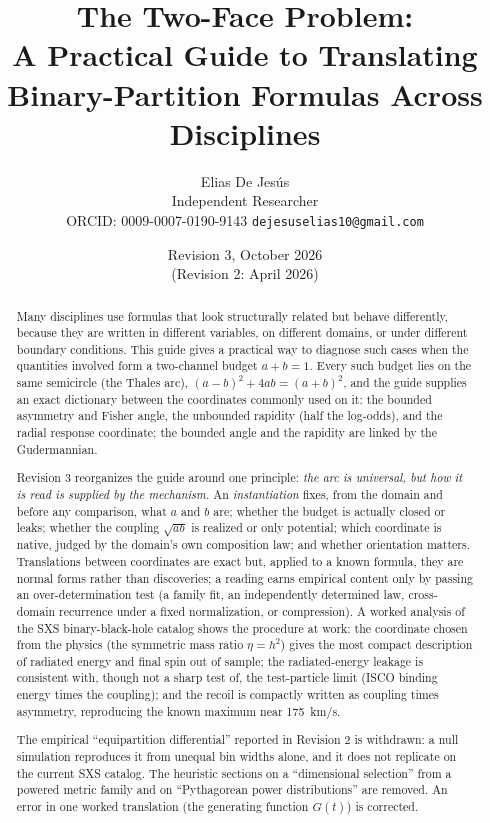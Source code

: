 \documentclass[11pt]{article}
\title{The Two-Face Problem:\\[2pt]
\large A Practical Guide to Translating Binary-Partition Formulas Across Disciplines}
\author{Elias De Jes\'us\\
\small Independent Researcher\\
\small ORCID: 0009-0007-0190-9143 \quad \texttt{dejesuselias10@gmail.com}}
\date{Revision 3, October 2026\\ \small (Revision 2: April 2026)}
\theoremstyle{definition}
\theoremstyle{remark}
\begin{document}
\maketitle

\begin{abstract}
Many disciplines use formulas that look structurally related but behave differently,
because they are written in different variables, on different domains, or under different
boundary conditions. This guide gives a practical way to diagnose such cases when the
quantities involved form a two-channel budget $a+b=1$. Every such budget lies on the same
semicircle (the Thales arc), $(a-b)^2+4ab=(a+b)^2$, and the guide supplies an exact
dictionary between the coordinates commonly used on it: the bounded asymmetry and Fisher
angle, the unbounded rapidity (half the log-odds), and the radial response coordinate;
the bounded angle and the rapidity are linked by the Gudermannian.

Revision 3 reorganizes the guide around one principle: \emph{the arc is universal, but how
it is read is supplied by the mechanism.} An \emph{instantiation} fixes, from the domain and
before any comparison, what $a$ and $b$ are; whether the budget is actually closed or leaks;
whether the coupling $\sqrt{ab}$ is realized or only potential; which coordinate is native,
judged by the domain's own composition law; and whether orientation matters. Translations
between coordinates are exact but, applied to a known formula, they are normal forms rather
than discoveries; a reading earns empirical content only by passing an over-determination
test (a family fit, an independently determined law, cross-domain recurrence under a fixed
normalization, or compression). A worked analysis of the SXS binary-black-hole catalog
shows the procedure at work: the coordinate chosen from the physics (the symmetric mass
ratio $\eta=h^2$) gives the most compact description of radiated energy and final spin out of
sample; the radiated-energy leakage is consistent with, though not a sharp test of, the
test-particle limit (ISCO binding energy times the coupling); and the recoil is compactly
written as coupling times asymmetry, reproducing the known maximum near 175~km/s.

The empirical ``equipartition differential'' reported in Revision 2 is withdrawn: a null
simulation reproduces it from unequal bin widths alone, and it does not replicate on the
current SXS catalog. The heuristic sections on a ``dimensional selection'' from a powered
metric family and on ``Pythagorean power distributions'' are removed. An error in one
worked translation (the generating function $G(t)$) is corrected.
\end{abstract}
\end{document}
